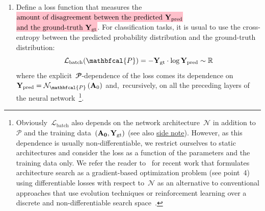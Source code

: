 \documentclass{article}
\newcommand{\mathcolorbox}[2]{\colorbox{#1}{$\displaystyle #2$}}
\begin{document}
\begin{enumerate}
\item Define a loss function that measures the \mathcolorbox{pink}{\text{amount of disagreement between the predicted}~{\bf Y}_\text{pred}}  \mathcolorbox{pink}{\text{and the ground-truth}~{\bf Y}_\text{gt}}.  For classification tasks, it is usual to use the cross-entropy between the predicted probability distribution and the ground-truth distribution:
\begin{equation*}
\mathcal{L}_\text{batch} ({\mathbfcal{P}}) = - {\bf Y}_\text{gt} \cdot \log {\bf Y}_\text{pred} \label{eq:batchLoss} \sim \mathbb{R}
\end{equation*}
\noindent where the explicit~$\mathbfcal{P}$-dependence of the loss comes its dependence on~${\bf Y}_\text{pred} = \mathcal{N}_{\mathbfcal{P}} \left( {\bf A}_0 \right)$ and,~recursively, on all the preceding layers of the neural network~\footnote{Obviously~$\mathcal{L}_\text{batch}$ also depends on the network architecture~$\mathcal{N}$ in addition to~$\mathcal{P}$ and the training data~$(\bf{A}_0, {\bf Y}_\text{gt})$ (see also \hyperlink{programmerNote}{side note}).  However, as this dependence is usually non-differentiable, we restrict ourselves to static architectures and consider the loss as a function of the parameters and the training data only.  We refer the reader to~\cite{optimizeNet} for recent work that formulates architecture search as a gradient-based optimization problem (see point~4) using differentiable losses with respect to~$\mathcal{N}$ as an alternative to conventional approaches that use evolution techniques or reinforcement learning over a discrete and non-differentiable search space~\cite{googleAIblog}.}.


\end{enumerate}
\end{document}
